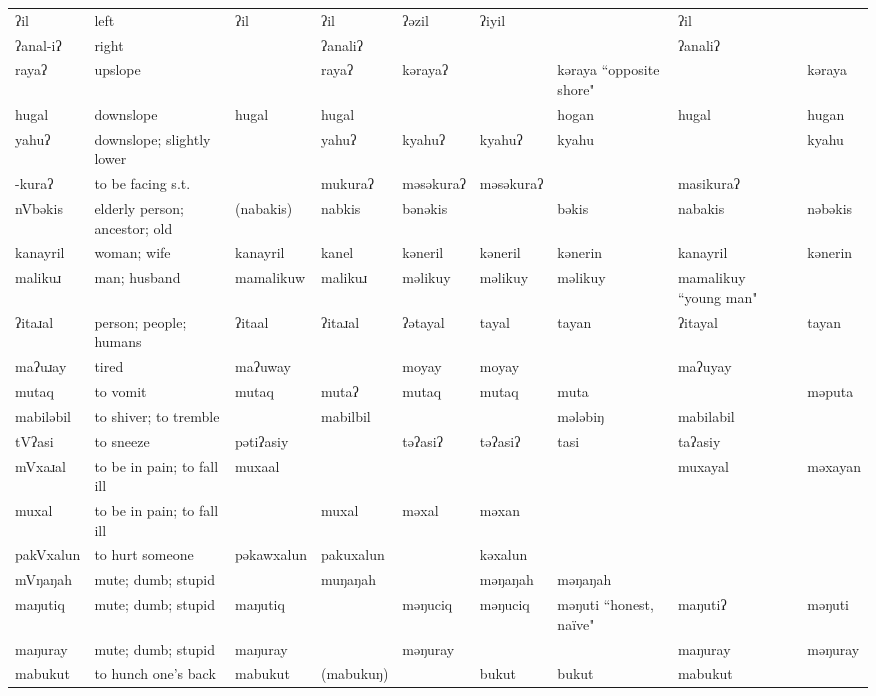 \begin{landscape}
\begin{longtable}{*{9}{p{}}}
\text{*}ʔil & left & ʔil & ʔil & ʔəzil & ʔiyil &  & ʔil & \\
\text{*}ʔanal-iʔ & right &  & ʔanaliʔ &  &  &  & ʔanaliʔ & \\
\text{*}rayaʔ & upslope &  & rayaʔ & kərayaʔ &  & kəraya ``opposite shore" &  & kəraya\\
\text{*}hugal & downslope & hugal & hugal &  &  & hogan & hugal & hugan\\
\text{*}yahuʔ & downslope; slightly lower &  & yahuʔ & kyahuʔ & kyahuʔ & kyahu &  & kyahu\\
\text{*}-kuraʔ & to be facing s.t. &  & mukuraʔ & məsəkuraʔ & məsəkuraʔ &  & masikuraʔ & \\
\text{*}nVbəkis & elderly person; ancestor; old & (nabakis) & nabkis & bənəkis &  & bəkis & nabakis & nəbəkis\\
\text{*}kanayril & woman; wife & kanayril & kanel & kəneril & kəneril & kənerin & kanayril & kənerin\\
\text{*}malikuɹ & man; husband & mamalikuw & malikuɹ & məlikuy & məlikuy & məlikuy & mamalikuy ``young man" & \\
\text{*}ʔitaɹal & person; people; humans & ʔitaal & ʔitaɹal & ʔətayal & tayal & tayan & ʔitayal & tayan\\
\text{*}maʔuɹay & tired & maʔuway &  & moyay & moyay &  & maʔuyay & \\
\text{*}mutaq & to vomit & mutaq & mutaʔ & mutaq & mutaq & muta &  & məputa\\
\text{*}mabiləbil & to shiver; to tremble &  & mabilbil &  &  & mələbiŋ & mabilabil & \\
\text{*}tVʔasi & to sneeze & pətiʔasiy &  & təʔasiʔ & təʔasiʔ & tasi & taʔasiy & \\
\text{*}mVxaɹal & to be in pain; to fall ill & muxaal &  &  &  &  & muxayal & məxayan\\
\text{*}muxal & to be in pain; to fall ill &  & muxal & məxal & məxan &  &  & \\
\text{*}pakVxalun & to hurt someone & pəkawxalun & pakuxalun &  & kəxalun &  &  & \\
\text{*}mVŋaŋah & mute; dumb; stupid &  & muŋaŋah &  & məŋaŋah & məŋaŋah &  & \\
\text{*}maŋutiq & mute; dumb; stupid & maŋutiq &  & məŋuciq & məŋuciq & məŋuti ``honest, naïve" & maŋutiʔ & məŋuti\\
\text{*}maŋuray & mute; dumb; stupid & maŋuray &  & məŋuray &  &  & maŋuray & məŋuray\\
\text{*}mabukut & to hunch one's back & mabukut & (mabukuŋ) &  & bukut & bukut & mabukut & \\

\end{longtable}
\end{landscape}
